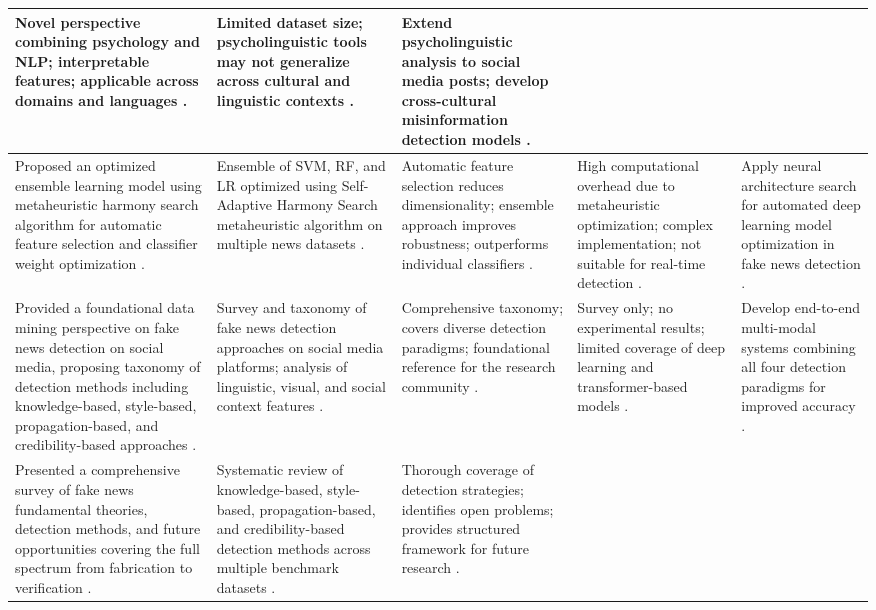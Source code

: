 \documentclass[runningheads]{llncs}
\begin{document}
\begin{longtable}{|p{}|p{}|p{}|p{}|p{}|}
Novel perspective combining psychology and NLP; interpretable features; applicable across domains and languages \cite{CarrascoFarre2022Fingerprints}. &
Limited dataset size; psycholinguistic tools may not generalize across cultural and linguistic contexts \cite{CarrascoFarre2022Fingerprints}. &
Extend psycholinguistic analysis to social media posts; develop cross-cultural misinformation detection models \cite{CarrascoFarre2022Fingerprints}. \\ \hline
Proposed an optimized ensemble learning model using metaheuristic harmony search algorithm for automatic feature selection and classifier weight optimization \cite{Huang2020FakeNews}. &
Ensemble of SVM, RF, and LR optimized using Self-Adaptive Harmony Search metaheuristic algorithm on multiple news datasets \cite{Huang2020FakeNews}. &
Automatic feature selection reduces dimensionality; ensemble approach improves robustness; outperforms individual classifiers \cite{Huang2020FakeNews}. &
High computational overhead due to metaheuristic optimization; complex implementation; not suitable for real-time detection \cite{Huang2020FakeNews}. &
Apply neural architecture search for automated deep learning model optimization in fake news detection \cite{Huang2020FakeNews}. \\ \hline
Provided a foundational data mining perspective on fake news detection on social media, proposing taxonomy of detection methods including knowledge-based, style-based, propagation-based, and credibility-based approaches \cite{Shu2017FakeNewsDetection}. &
Survey and taxonomy of fake news detection approaches on social media platforms; analysis of linguistic, visual, and social context features \cite{Shu2017FakeNewsDetection}. &
Comprehensive taxonomy; covers diverse detection paradigms; foundational reference for the research community \cite{Shu2017FakeNewsDetection}. &
Survey only; no experimental results; limited coverage of deep learning and transformer-based models \cite{Shu2017FakeNewsDetection}. &
Develop end-to-end multi-modal systems combining all four detection paradigms for improved accuracy \cite{Shu2017FakeNewsDetection}. \\ \hline
Presented a comprehensive survey of fake news fundamental theories, detection methods, and future opportunities covering the full spectrum from fabrication to verification \cite{Zhou2020Survey}. &
Systematic review of knowledge-based, style-based, propagation-based, and credibility-based detection methods across multiple benchmark datasets \cite{Zhou2020Survey}. &
Thorough coverage of detection strategies; identifies open problems; provides structured framework for future research \cite{Zhou2020Survey}. &

\end{longtable}
\end{document}
